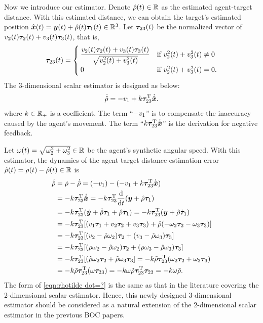 \documentclass[5p,authoryear,preprint]{elsarticle}\linenofalse
\begin{document}
Now we introduce our estimator.
Denote $\hat{\rho}(t)\in\mathbb{R}$ as the estimated agent-target distance.
With this estimated distance, we can obtain the target's estimated position $\hat{\bm{x}}(t)=\bm{y}(t)+\hat{\rho}(t)\bm{\tau}_1(t)\in\mathbb{R}^3$.
Let $\bm{\tau}_{23}(t)$ be the normalized vector of $v_2(t)\bm{\tau}_2(t)+v_3(t)\bm{\tau}_3(t)$,
that is,
\[
\bm{\tau}_{23}(t)=\begin{cases}\displaystyle
	\frac{v_2(t)\bm{\tau}_2(t)+v_3(t)\bm{\tau}_3(t)}{\sqrt{v_2^2(t)+v_3^2(t)}}&\text{if }v_2^2(t)+v_3^2(t)\ne0\\
	0&\text{if }v_2^2(t)+v_3^2(t)=0.
\end{cases}
\]
The 3-dimensional scalar estimator is designed as below:
\begin{equation}\label{eqn:estimator}
\dot{\hat{\rho}}=-v_1+k\bm{\tau}_{23}^\mathrm{T}\dot{\hat{\bm{x}}}.
\end{equation}
where $k\in\mathbb{R}_+$ is a coefficient.
The term ``$-v_1$'' is to compensate the inaccuracy caused by the agent’s movement.
The term ``$k\bm{\tau}_{23}^\mathrm{T}\dot{\hat{\bm{x}}}$'' is the derivation for negative feedback.

Let $\omega(t)=\sqrt{\omega_2^2+\omega_3^2}\in\mathbb{R}$ be the agent's synthetic angular speed.
With this estimator, the dynamics of the agent-target distance estimation error 
$\tilde{\rho}(t)=\rho(t)-\hat{\rho}(t)\in\mathbb{R}$ is 
\begin{equation}\label{eqn:rhotilde dot=?}\begin{aligned}
\dot{\tilde{\rho}}&=\dot{\rho}-\dot{\hat{\rho}}=(-v_1)-(-v_1+k\bm{\tau}_{23}^\mathrm{T}\dot{\hat{\bm{x}}})\\
&=-k\bm{\tau}_{23}^\mathrm{T}\dot{\hat{\bm{x}}}=-k\bm{\tau}_{23}^\mathrm{T}\frac{\mathrm d}{\mathrm dt}(\bm{y}+\hat{\rho}\bm{\tau}_1)\\
&=-k\bm{\tau}_{23}^\mathrm{T}(\dot{\bm{y}}+\dot{\hat{\rho}}\bm{\tau}_1+\hat{\rho}\dot{\bm{\tau}}_1)=-k\bm{\tau}_{23}^\mathrm{T}(\dot{\bm{y}}+\hat{\rho}\dot{\bm{\tau}}_1)\\
&=-k\bm{\tau}_{23}^\mathrm{T}[(v_1\bm{\tau}_1+v_2\bm{\tau}_2+v_3\bm{\tau}_3)+\hat{\rho}(-\omega_2\bm{\tau}_2-\omega_3\bm{\tau}_3)]\\
&=-k\bm{\tau}_{23}^\mathrm{T}[(v_2-\hat{\rho}\omega_2)\bm{\tau}_2+(v_3-\hat{\rho}\omega_3)\bm{\tau}_3]\\
&=-k\bm{\tau}_{23}^\mathrm{T}[(\rho\omega_2-\hat{\rho}\omega_2)\bm{\tau}_2+(\rho\omega_3-\hat{\rho}\omega_3)\bm{\tau}_3]\\
&=-k\bm{\tau}_{23}^\mathrm{T}[(\tilde{\rho}\omega_2\bm{\tau}_2+\tilde{\rho}\omega_3\bm{\tau}_3]
=-k\tilde{\rho}\bm{\tau}_{23}^\mathrm{T}(\omega_2\bm{\tau}_2+\omega_3\bm{\tau}_3)\\
&=-k\tilde{\rho}\bm{\tau}_{23}^\mathrm{T}(\omega\bm{\tau}_{23})=-k\omega\tilde{\rho}\bm{\tau}_{23}^\mathrm{T}\bm{\tau}_{23}=-k\omega\tilde{\rho}.
\end{aligned}\end{equation}
The form of \eqref{eqn:rhotilde dot=?} is the same as that in the literature covering the 2-dimensional scalar estimator.
Hence, this newly designed 3-dimensional estimator should be considered as a natural extension of the 2-dimensional scalar estimator in the previous BOC papers.
\end{document}
